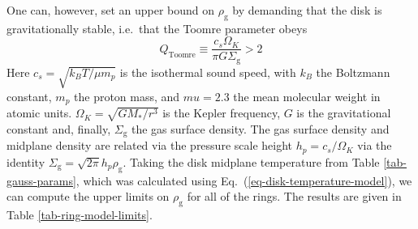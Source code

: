\documentclass{aa}
\begin{document}
One can, however, set an upper bound on $\rho_{\mathrm{g}}$ by demanding that
the disk is gravitationally stable, i.e.\ that the Toomre parameter obeys
\begin{equation}
Q_{\mathrm{Toomre}}\equiv \frac{c_s\Omega_K}{\pi G \Sigma_{\mathrm{g}}} >2
\end{equation}
Here $c_s=\sqrt{k_BT/\mu m_p}$ is the isothermal sound speed, with $k_B$ the
Boltzmann constant, $m_p$ the proton mass, and $mu=2.3$ the mean molecular
weight in atomic units. $\Omega_K=\sqrt{GM_{*}/r^3}$ is the Kepler frequency,
$G$ is the gravitational constant and, finally, $\Sigma_{\mathrm{g}}$ the gas
surface density. The gas surface density and midplane density are related via
the pressure scale height $h_p=c_s/\Omega_K$ via the identity
$\Sigma_{\mathrm{g}}=\sqrt{2\pi}h_p\rho_{\mathrm{g}}$. Taking the disk midplane
temperature from Table \ref{tab-gauss-params}, which was calculated using
Eq.~(\ref{eq-disk-temperature-model}), we can compute the upper limits on
$\rho_{\mathrm{g}}$ for all of the rings. The results are given in Table
\ref{tab-ring-model-limits}.
\end{document}
